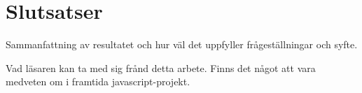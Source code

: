 \section{Slutsatser}
\label{sec:joel_o-conclusion}
Sammanfattning av resultatet och hur väl det uppfyller frågeställningar och syfte.

Vad läsaren kan ta med sig frånd detta arbete. Finns det något att vara medveten om i framtida javascript-projekt.
